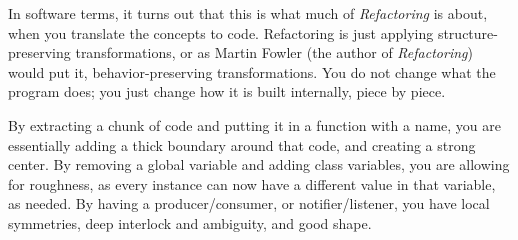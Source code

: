 In software terms, it turns out that this is what much of \textit{Refactoring} is about, when you translate the concepts to code. Refactoring is just applying structure-preserving transformations, or as Martin Fowler (the author of \textit{Refactoring}) would put it, behavior-preserving transformations. You do not change what the program does; you just change how it is built internally, piece by piece.

By extracting a chunk of code and putting it in a function with a name, you are essentially adding a thick boundary around that code, and creating a strong center. By removing a global variable and adding class variables, you are allowing for roughness, as every instance can now have a different value in that variable, as needed. By having a producer/consumer, or notifier/listener, you have local symmetries, deep interlock and ambiguity, and good shape.

